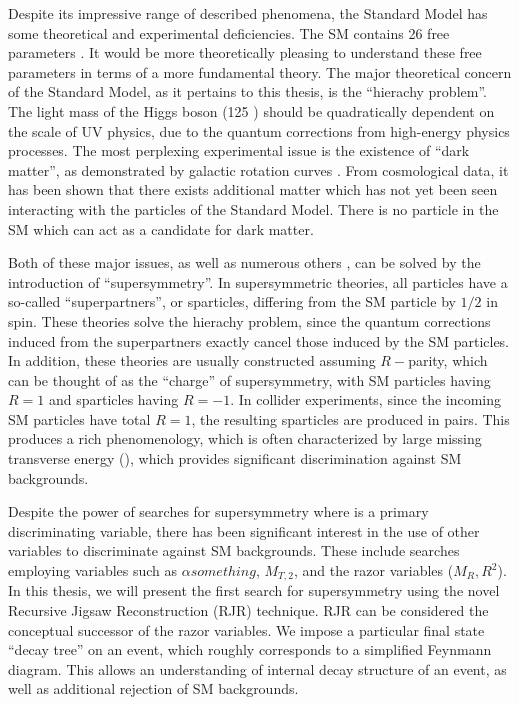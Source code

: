 Despite its impressive range of described phenomena, the Standard Model has some theoretical and experimental deficiencies.
The SM contains 26 free parameters \footnotemark.
It would be more theoretically pleasing to understand these free parameters in terms of a more fundamental theory.
The major theoretical concern of the Standard Model, as it pertains to this thesis, is the ``hierachy problem''\cite {Weinberg:1975gm,Weinberg:1979bn , Gildener:1976ai, Susskind:1978ms, susyPrimer}.
The light mass of the Higgs boson (125 \GeV) should be quadratically dependent on the scale of UV physics, due to the quantum corrections from high-energy physics processes.
The most perplexing experimental issue is the existence of ``dark matter'', as demonstrated by galactic rotation curves \cite{Rubin:1970zza, Roberts:1970zza, Rubin:1980zd, Rubin:1985ze, Bosma:1981zz, Persic:1995ru }.
From cosmological data, it has been shown that there exists additional matter which has not yet been seen interacting with the particles of the Standard Model.
There is no particle in the SM which can act as a candidate for dark matter.

Both of these major issues, as well as numerous others , can be solved by the introduction of ``supersymmetry''.
In supersymmetric theories, all particles have a so-called ``superpartners'', or sparticles, differing from the SM particle by $1/2$ in spin.
These theories solve the hierachy problem, since the quantum corrections induced from the superpartners exactly cancel those induced by the SM particles.
In addition, these theories are usually constructed assuming $R-$parity, which can be thought of as the ``charge'' of supersymmetry, with SM particles having $R=1$ and sparticles having $R=-1$.
In collider experiments, since the incoming SM particles have total $R=1$, the resulting sparticles are produced in pairs.
This produces a rich phenomenology, which is often characterized by large missing transverse energy (\met), which provides significant discrimination against SM backgrounds.

Despite the power of searches for supersymmetry where \met is a primary discriminating variable, there has been significant interest in the use of other variables to discriminate against SM backgrounds.
These include searches employing variables such as $\alpha{something}$, $ M_{T,2}$, and the razor variables ($M_R, R^2$). 
In this thesis, we will present the first search for supersymmetry using the novel Recursive Jigsaw Reconstruction (RJR) technique.
RJR can be considered the conceptual successor of the razor variables.
We impose a particular final state ``decay tree'' on an event, which roughly corresponds to a simplified Feynmann diagram.
This allows an understanding of internal decay structure of an event, as well as additional rejection of SM backgrounds.

